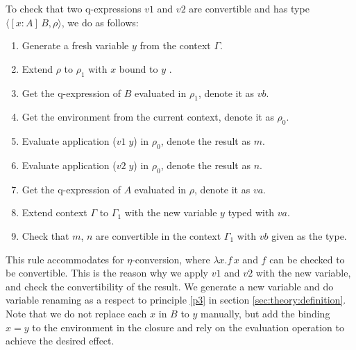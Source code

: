 \documentclass{article}
\theoremstyle{remark}
\begin{document}
To check that two q-expressions $v1$ and $v2$ are convertible and has type $\langle [x : A] \, B, \rho \rangle$, we do as follows:
\begin{enumerate}
\item Generate a fresh variable $y$ from the context $\Gamma$.
\item Extend $\rho$ to $\rho_1$ with $x$ bound to $y$ .
\item Get the q-expression of $B$ evaluated in $\rho_1$, denote it as $vb$.
\item Get the environment from the current context, denote it as $\rho_0$.
\item Evaluate application ($v1 \; y$) in $\rho_0$, denote the result as $m$.
\item Evaluate application ($v2 \; y$) in $\rho_0$, denote the result as $n$.
\item Get the q-expression of $A$ evaluated in $\rho$, denote it as $va$.
\item Extend context $\Gamma$ to $\Gamma_1$ with the new variable $y$ typed with $va$.
\item Check that $m$, $n$ are convertible in the context $\Gamma_1$ with $vb$ given as the type.
\end{enumerate}

This rule accommodates for $\eta$-conversion, where $\lambda x . f \, x$ and $f$ can be checked to be convertible. This is the reason why we apply $v1$ and $v2$ with the new variable, and check the convertibility of the result. We generate a new variable and do variable renaming as a respect to principle \ref{p3} in section \ref{sec:theory:definition}. Note that we do not replace each $x$ in $B$ to $y$ manually, but add the binding $x = y$ to the environment in the closure and rely on the evaluation operation to achieve the desired effect.
\end{document}
